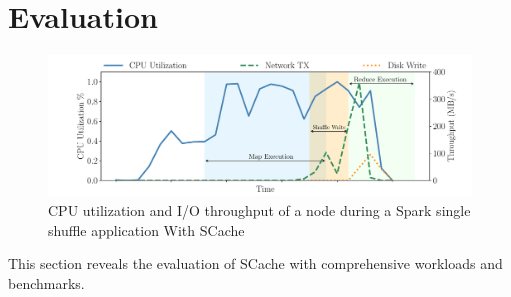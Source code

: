 \section{Evaluation}\label{evaluation}
\begin{figure}
	\includegraphics[width=\linewidth]{fig/scache_util}
	\caption{CPU utilization and I/O throughput of a node during a Spark single shuffle application With SCache}
	\label{fig:scache_util}
	\vspace{-1em}
\end{figure}
This section reveals the evaluation of SCache with comprehensive workloads and benchmarks. 
 \cite{spark-tera}  
